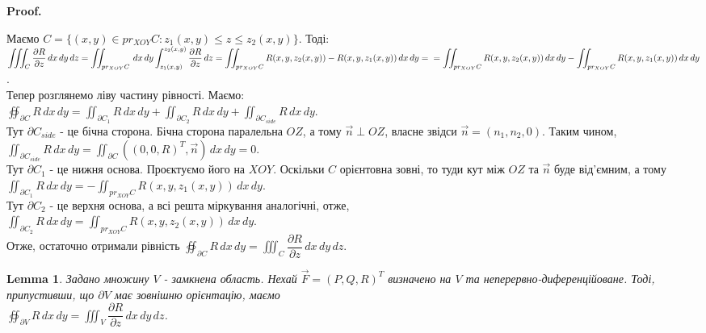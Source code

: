 \documentclass[a4paper, 10pt]{article}
\makeatletter
\def\departial#1#2{\dfrac{\partial {#1}}{\partial {#2}}}
\def\qed{$\blacksquare$}
\theoremstyle{theoremdd}
\theoremstyle{theoremdd}
\theoremstyle{theoremdd}
\theoremstyle{theoremdd}
\theoremstyle{theoremdd}
\theoremstyle{theoremdd}
\theoremstyle{theoremdd}
\theoremstyle{theoremdd}
\theoremstyle{theoremdd}
\theoremstyle{theoremdd}
\theoremstyle{theoremdd}
\theoremstyle{theoremdd}
\theoremstyle{theoremdd}
\newtheorem{lemma}[theorem]{Lemma}
\theoremstyle{theoremdd}
\theoremstyle{theoremdd}
\renewenvironment{proof}[1][Proof.\\]{\par
\pushQED{\hfill \qed}%
\normalfont \topsep6\p@\@plus6\p@\relax
\trivlist
\item\relax
{\bfseries
#1\@addpunct{.}}\hspace\labelsep\ignorespaces
}{%
\popQED\endtrivlist\@endpefalse
}
\makeatother
\begin{document}
\begin{proof}
Маємо $C = \{ (x,y) \in pr_{XOY}C: z_1(x,y) \leq z \leq z_2(x,y) \}$. Тоді:\\
$\displaystyle\iiint_C \departial{R}{z}\,dx\,dy\,dz = \iint_{pr_{XOY} C}\,dx\,dy \int_{z_1(x,y)}^{z_2(x,y)} \departial{R}{z}\,dz = \iint_{pr_{XOY} C} R(x,y,z_2(x,y)) - R(x,y,z_1(x,y))\,dx\,dy = \\
= \iint_{pr_{XOY} C} R(x,y,z_2(x,y))\,dx\,dy - \iint_{pr_{XOY} C} R(x,y,z_1(x,y))\,dx\,dy$.\\
Тепер розглянемо ліву частину рівності. Маємо:\\
$\displaystyle\oiint_{\partial C} R\,dx\,dy = \iint_{\partial C_1} R\,dx\,dy + \iint_{\partial C_2} R\,dx\,dy + \iint_{\partial C_{side}} R\,dx\,dy$.\\
Тут $\partial C_{side}$ - це бічна сторона. Бічна сторона паралельна $OZ$, а тому $\vec{n} \perp OZ$, власне звідси $\vec{n} = (n_1,n_2,0)$. Таким чином,\\
$\displaystyle\iint_{\partial C_{side}} R\,dx\,dy = \iint_{\partial C} ((0,0,R)^T, \vec{n})\,dx\,dy = 0$.\\
Тут $\partial C_1$ - це нижня основа. Проєктуємо його на $XOY$. Оскільки $C$ орієнтовна зовні, то туди кут між $OZ$ та $\vec{n}$ буде від'ємним, а тому \\
$\displaystyle\iint_{\partial C_1} R\,dx\,dy = -\iint_{pr_{XOY} C} R(x,y,z_1(x,y))\,dx\,dy$.\\
Тут $\partial C_2$ - це верхня основа, а всі решта міркування аналогічні, отже,\\
$\displaystyle\iint_{\partial C_2} R\,dx\,dy = \iint_{pr_{XOY} C} R(x,y,z_2(x,y))\,dx\,dy$.\\
Отже, остаточно отримали рівність $\displaystyle\oiint_{\partial C} R\,dx\,dy = \iiint_C \departial{R}{z}\,dx\,dy\,dz$.
\end{proof}

\begin{lemma}
Задано множину $V$ - замкнена область. Нехай $\vec{F} = (P,Q,R)^T$ визначено на $V$ та неперервно-диференційоване. Тоді, припустивши, що $\partial V$ має зовнішню орієнтацію, маємо\\
$\displaystyle\oiint_{\partial V} R\,dx\,dy = \iiint_V \departial{R}{z}\,dx\,dy\,dz$.
\end{lemma}
\end{document}
